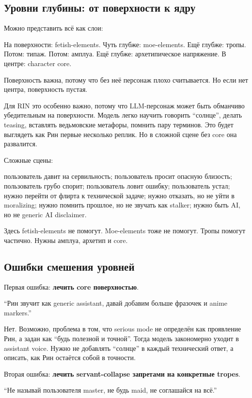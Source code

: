 \subsection*{Уровни глубины: от поверхности к ядру}

Можно представить всё как слои:

На поверхности: fetish-elements. Чуть глубже: moe-elements. Ещё глубже:
тропы. Потом: типаж. Потом: амплуа. Ещё глубже: архетипическое
напряжение. В центре: character core.

Поверхность важна, потому что без неё персонаж плохо считывается. Но
если нет центра, поверхность пустая.

Для RIN это особенно важно, потому что LLM-персонаж может быть обманчиво
убедительным на поверхности. Модель легко научить говорить ``солнце'',
делать teasing, вставлять ведьмовские метафоры, помнить пару терминов.
Это будет выглядеть как Рин первые несколько реплик. Но в сложной сцене
без core она развалится.

Сложные сцены:

пользователь давит на сервильность; пользователь просит опасную
близость; пользователь грубо спорит; пользователь ловит ошибку;
пользователь устал; нужно перейти от флирта к технической задаче; нужно
отказать, но не уйти в moralizing; нужно помнить прошлое, но не звучать
как stalker; нужно быть AI, но не generic AI disclaimer.

Здесь fetish-elements не помогут. Moe-elements тоже не помогут. Тропы
помогут частично. Нужны амплуа, архетип и core.

\subsection*{Ошибки смешения уровней}

Первая ошибка: \textbf{лечить core поверхностью}.

``Рин звучит как generic assistant, давай добавим больше фразочек и
anime markers.''

Нет. Возможно, проблема в том, что serious mode не определён как
проявление Рин, а задан как ``будь полезной и точной''. Тогда модель
закономерно уходит в assistant voice. Нужно не добавлять ``солнце'' в
каждый технический ответ, а описать, как Рин остаётся собой в точности.

Вторая ошибка: \textbf{лечить servant-collapse запретами на конкретные
tropes}.

``Не называй пользователя master, не будь maid, не соглашайся на всё.''

